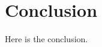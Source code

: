 \documentclass[letterpaper, 10 pt, conference]{ieeetran}
\begin{document}
 
 
\section{Conclusion}
\label{sec:conclu}  
Here is the conclusion.








\end{document}
